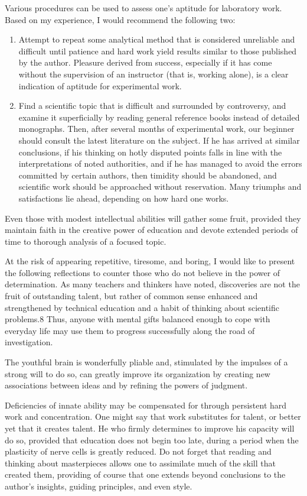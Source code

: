 \documentclass{article}
\begin{document}
Various procedures can be used to assess one’s aptitude for laboratory work. Based on my experience, I would recommend the following two:

\begin{enumerate}  
    \item Attempt to repeat some analytical method that is considered unreliable and difficult until patience and hard work yield results similar to those published by the author. Pleasure derived from success, especially if it has come without the supervision of an instructor (that is, working alone), is a clear indication of aptitude for experimental work.  
    \item Find a scientific topic that is difficult and surrounded by controversy, and examine it superficially by reading general reference books instead of detailed monographs. Then, after several months of experimental work, our beginner should consult the latest literature on the subject. If he has arrived at similar conclusions, if his thinking on hotly disputed points falls in line with the interpretations of noted authorities, and if he has managed to avoid the errors committed by certain authors, then timidity should be abandoned, and scientific work should be approached without reservation. Many triumphs and satisfactions lie ahead, depending on how hard one works.
\end{enumerate}

Even those with modest intellectual abilities will gather some fruit, provided they maintain faith in the creative power of education and devote extended periods of time to thorough analysis of a focused topic.

At the risk of appearing repetitive, tiresome, and boring, I would like to present the following reflections to counter those who do not believe in the power of determination. As many teachers and thinkers have noted, discoveries are not the fruit of outstanding talent, but rather of common sense enhanced and strengthened by technical education and a habit of thinking about scientific problems.8 Thus, anyone with mental gifts balanced enough to cope with everyday life may use them to progress successfully along the road of investigation.

The youthful brain is wonderfully pliable and, stimulated by the impulses of a strong will to do so, can greatly improve its organization by creating new associations between ideas and by refining the powers of judgment.

Deficiencies of innate ability may be compensated for through persistent hard work and concentration. One might say that work substitutes for talent, or better yet that it creates talent. He who firmly determines to improve his capacity will do so, provided that education does not begin too late, during a period when the plasticity of nerve cells is greatly reduced. Do not forget that reading and thinking about masterpieces allows one to assimilate much of the skill that created them, providing of course that one extends beyond conclusions to the author’s insights, guiding principles, and even style.
\end{document}
